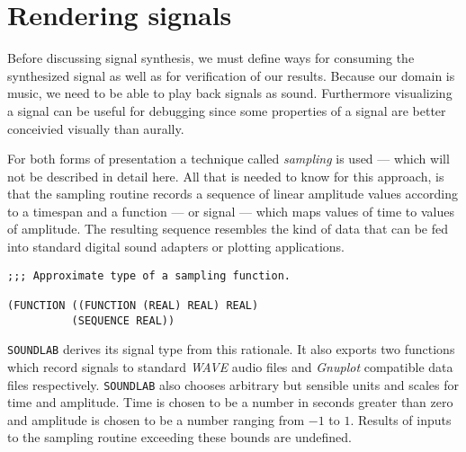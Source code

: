 \section{Rendering signals}

Before discussing signal synthesis, we must define ways for consuming the
synthesized signal as well as for verification of our results. Because
our domain is music, we need to be able to play back signals as sound.
Furthermore visualizing a signal can be useful for debugging since some
properties of a signal are better conceivied visually than
aurally.

For both forms of presentation a technique called \textit{sampling} is
used --- which will not be described in detail here. All that is needed
to know for this approach, is that the sampling routine records a
sequence of linear amplitude values according to a timespan and a
function --- or signal --- which maps values of time to values of
amplitude. The resulting sequence resembles the kind of data that can be
fed into standard digital sound adapters or plotting applications.

\begin{verbatim}
;;; Approximate type of a sampling function.

(FUNCTION ((FUNCTION (REAL) REAL) REAL)
          (SEQUENCE REAL))
\end{verbatim}

\texttt{SOUNDLAB} derives its signal type from this rationale. It also
exports two functions which record signals to standard \textit{WAVE}
audio files and \textit{Gnuplot} compatible data files
respectively. \texttt{SOUNDLAB} also chooses arbitrary but sensible units
and scales for time and amplitude. Time is chosen to be a number in
seconds greater than zero and amplitude is chosen to be a number ranging
from $-1$ to $1$. Results of inputs to the sampling routine exceeding
these bounds are undefined.
